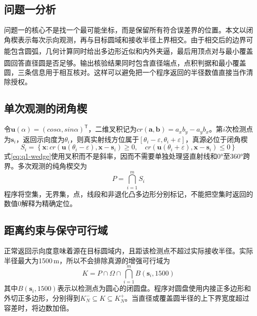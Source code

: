 \documentclass[UTF8,12pt,a4paper]{ctexart}
\newcommand{\vect}[1]{\boldsymbol{#1}}
\numberwithin{equation}{section}
\begin{document}
\subsection{问题一分析}

问题一的核心不是找一个最可能坐标，而是保留所有符合误差界的位置。本文以闭角楔表示每次示向观测，再与目标圆域和接收半径上界相交。由于相交后的边界可能包含圆弧，几何计算同时给出多边形近似和内外夹逼\textsuperscript{\normalfont\cite{sutherland,deberg}}，最后用顶点对与最小覆盖圆回答直径圆是否足够\textsuperscript{\normalfont\cite{welzl}}。输出核验结果同时包含直径端点，点积判据和最小覆盖圆，三条信息用于相互核对。这样可以避免把一个程序返回的半径数值直接当作清除授权。

\subsection{单次观测的闭角楔}

令$\vect{u}(\alpha)=(\mathit{cos}\alpha,\mathit{sin}\alpha)^{\mathsf T}$，二维叉积记为$cr(\vect{a},\vect{b})=a_xb_y-a_yb_x$。第$i$次检测点为$\vect{s}_i$，返回示向度为$\theta_i$，则真实射线方位属于$[\theta_i-\varepsilon,\theta_i+\varepsilon]$，真源必位于闭角楔
\begin{equation}
S_i=\left\{\vect{x}: cr\left(\vect{u}(\theta_i-\varepsilon),\vect{x}-\vect{s}_i\right)\geq0,\quad cr\left(\vect{u}(\theta_i+\varepsilon),\vect{x}-\vect{s}_i\right)\leq0\right\}
\label{eq:q1-wedge}
\end{equation}
式\eqref{eq:q1-wedge}使用叉积而不是斜率，因而不需要单独处理竖直射线和0°至360°跨界。多次观测的纯角楔交为
\begin{equation}
P=\bigcap_{i=1}^{m}S_i
\label{eq:q1-angle-domain}
\end{equation}
程序将空集，无界集，点，线段和非退化凸多边形分别标记，不能把空集时返回的数值0解释为精确定位。

\subsection{距离约束与保守可行域}

正常返回示向度意味着源在目标圆域内，且距该检测点不超过实际接收半径。实际半径最大为1500\,m，所以不会排除真源的增强可行域为
\begin{equation}
K=P\cap\Omega\cap\bigcap_{i=1}^{m}B(\vect{s}_i,1500)
\label{eq:q1-domain}
\end{equation}
其中$B(\vect{s}_i,1500)$表示以检测点为圆心的闭圆盘。程序对圆盘使用内接正多边形和外切正多边形，分别得到$K_N^{-}\subseteq K\subseteq K_N^{+}$。当直径或覆盖圆半径的上下界宽度超过容差时，将边数加倍。
\end{document}

